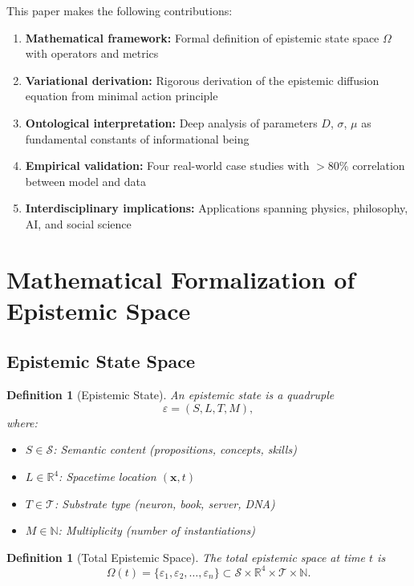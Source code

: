 \documentclass[12pt]{article}
\newtheorem{definition}[theorem]{Definition}
\begin{document}
This paper makes the following contributions:
\begin{enumerate}
    \item \textbf{Mathematical framework:} Formal definition of epistemic state space $\Omega$ with operators and metrics
    \item \textbf{Variational derivation:} Rigorous derivation of the epistemic diffusion equation from minimal action principle
    \item \textbf{Ontological interpretation:} Deep analysis of parameters $D$, $\sigma$, $\mu$ as fundamental constants of informational being
    \item \textbf{Empirical validation:} Four real-world case studies with $>80\%$ correlation between model and data
    \item \textbf{Interdisciplinary implications:} Applications spanning physics, philosophy, AI, and social science
\end{enumerate}

\section{Mathematical Formalization of Epistemic Space}

\subsection{Epistemic State Space}

\begin{definition}[Epistemic State]
An \emph{epistemic state} is a quadruple
\begin{equation}
    \varepsilon = (S, L, T, M),
\end{equation}
where:
\begin{itemize}
    \item $S \in \mathcal{S}$: Semantic content (propositions, concepts, skills)
    \item $L \in \mathbb{R}^4$: Spacetime location $(\mathbf{x}, t)$
    \item $T \in \mathcal{T}$: Substrate type (neuron, book, server, DNA)
    \item $M \in \mathbb{N}$: Multiplicity (number of instantiations)
\end{itemize}
\end{definition}

\begin{definition}[Total Epistemic Space]
The \emph{total epistemic space} at time $t$ is
\begin{equation}
    \Omega(t) = \{\varepsilon_1, \varepsilon_2, \ldots, \varepsilon_n\} \subset \mathcal{S} \times \mathbb{R}^4 \times \mathcal{T} \times \mathbb{N}.
\end{equation}
\end{definition}
\end{document}
